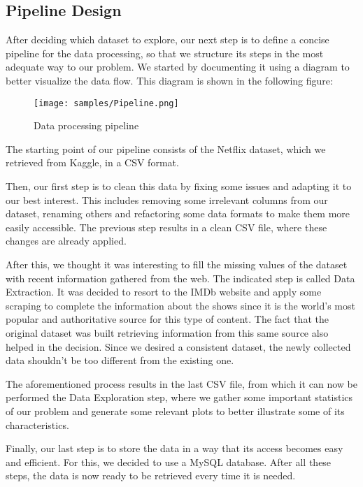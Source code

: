 \documentclass[sigplan,screen]{acmart}
\begin{document}
\subsection{Pipeline Design}

After deciding which dataset to explore, our next step is to define a concise pipeline for the data processing, so that we structure its steps in the most adequate way to our problem. We started by documenting it using a diagram to better visualize the data flow. This diagram is shown in the following figure:

\begin{figure}[h]
  \centering
  \texttt{[image: samples/Pipeline.png]}
  \caption{Data processing pipeline}
\end{figure}

The starting point of our pipeline consists of the Netflix dataset, which we retrieved from Kaggle, in a CSV format. 

Then, our first step is to clean this data by fixing some issues and adapting it to our best interest. This includes removing some irrelevant columns from our dataset, renaming others and refactoring some data formats to make them more easily accessible. The previous step results in a clean CSV file, where these changes are already applied. 

After this, we thought it was interesting to fill the missing values of the dataset with recent information gathered from the web. The indicated step is called Data Extraction. It was decided to resort to the IMDb website and apply some scraping to complete the information about the shows since it is the world's most popular and authoritative source for this type of content. The fact that the original dataset was built retrieving information from this same source also helped in the decision. Since we desired a consistent dataset, the newly collected data shouldn't be too different from the existing one.

The aforementioned process results in the last CSV file, from which it can now be performed the Data Exploration step, where we gather some important statistics of our problem and generate some relevant plots to better illustrate some of its characteristics. 

Finally, our last step is to store the data in a way that its access becomes easy and efficient. For this, we decided to use a MySQL database. After all these steps, the data is now ready to be retrieved every time it is needed.
\end{document}
